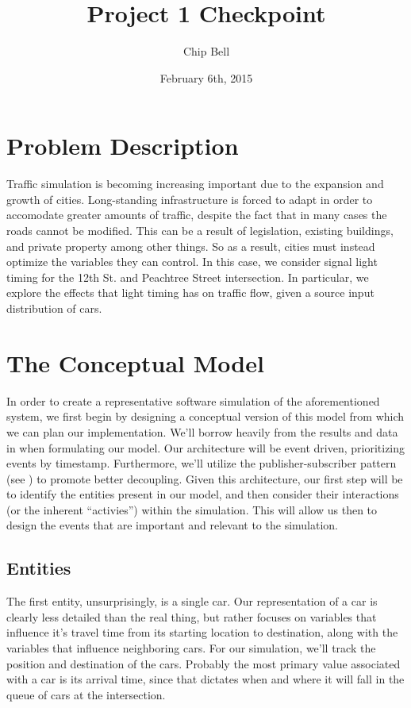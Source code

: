 \documentclass[a4paper,12pt]{article}
\begin{document}
\title{Project 1 Checkpoint}
\author{Chip Bell}
\date{February 6th, 2015}
\maketitle

\section{Problem Description}
Traffic simulation is becoming increasing important due to the expansion and growth of cities. Long-standing
infrastructure is forced to adapt in order to accomodate greater amounts of traffic, despite the fact that in many
cases the roads cannot be modified. This can be a result of legislation, existing buildings, and private property among
other things. So as a result, cities must instead optimize the variables they can control. In this case, we consider
signal light timing for the 12th St. and Peachtree Street intersection. In particular,
we explore the effects that light timing has on traffic flow, given a source input distribution of cars.

\section{The Conceptual Model}
In order to create a representative software simulation of the aforementioned system, we first begin by designing a
conceptual version of this model from which we can plan our implementation. We'll borrow heavily from the results and data
in \cite{cts12} when formulating our model.
Our architecture will be event driven, prioritizing events by timestamp. Furthermore,
we'll utilize the publisher-subscriber pattern (see \cite{pubsub}) to promote better decoupling.
Given this architecture, our first step will be to identify the entities present in our model, and then consider their
interactions (or the inherent ``activies'') within the simulation. This will allow us then to design the events that
are important and relevant to the simulation.

\subsection{Entities}
The first entity, unsurprisingly, is a single car. Our representation of a car is clearly less detailed than the real
thing, but rather focuses on variables that influence it's travel time from its starting location to destination, along
with the variables that influence neighboring cars. For our simulation, we'll track the position and destination of the
cars. Probably the most primary value associated with a car is its arrival time, since that dictates when and where it
will fall in the queue of cars at the intersection.
\end{document}
